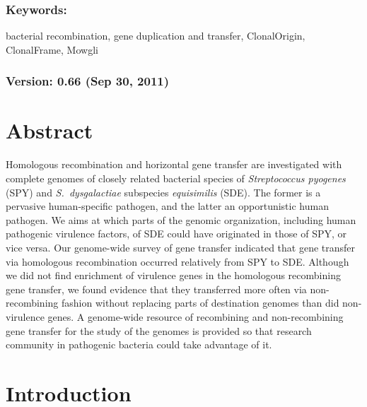\documentclass[english]{article}
\begin{document}
\subsubsection*{Keywords:}

bacterial recombination, gene duplication and transfer, ClonalOrigin,
ClonalFrame, Mowgli


\subsubsection*{Version: 0.66 (Sep 30, 2011) \clearpage{}}


\section*{Abstract}
Homologous recombination and horizontal gene transfer are investigated with
complete genomes of closely related bacterial species of \textit{Streptococcus
pyogenes} (SPY) and \textit{S.\ dysgalactiae} subspecies \textit{equisimilis}
(SDE).  The former is a pervasive human-specific pathogen, and the latter an
opportunistic human pathogen.  We aims at which parts of the genomic
organization, including human pathogenic virulence factors, of SDE could have
originated in those of SPY, or vice versa.  Our genome-wide survey of gene
transfer indicated that gene transfer via homologous recombination occurred
relatively from SPY to SDE.  Although we did not find enrichment of virulence
genes in the homologous recombining gene transfer, we found evidence that they
transferred more often via non-recombining fashion without replacing parts of
destination genomes than did non-virulence genes.  A genome-wide resource of
recombining and non-recombining gene transfer for the study of the genomes is
provided so that research community in pathogenic bacteria could take advantage
of it.

\clearpage{}

\section{Introduction}
\end{document}
